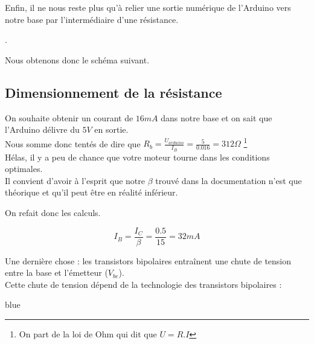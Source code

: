 {

    Enfin, il ne nous reste plus qu'à relier une sortie numérique de l'Arduino vers notre base par l'intermédiaire d'une résistance.

    .

    Nous obtenons donc le schéma suivant.


    \subsection{Dimensionnement de la résistance}

    On souhaite obtenir un courant de $16 mA$ dans notre base et on sait que l'Arduino délivre du $5V$ en sortie.\\

    Nous somme donc tentés de dire que $R_b = \frac{U_{arduino}}{ I_{B}} = \frac{5}{0.016} = 312 \Omega$ \footnote{On part de la loi de Ohm qui dit que $U=R.I$}\\


    Hélas, il y a peu de chance que votre moteur tourne dans les conditions optimales.\\
    Il convient d'avoir à l'esprit que notre $\beta$ trouvé dans la documentation n'est que théorique et qu'il peut être en réalité inférieur.

    
    On refait donc les calculs.

    $$  I_{B} = \frac{I_{C}}{\beta} = \frac{0.5}{15} = 32 mA $$

    Une dernière chose : les transistors bipolaires entraînent une chute de tension entre la base et l'émetteur ($V_{be}$).\\
    Cette chute de tension dépend de la technologie des transistors bipolaires : 

    \begin{items}{blue}{\Triangle}


\end{items}}
